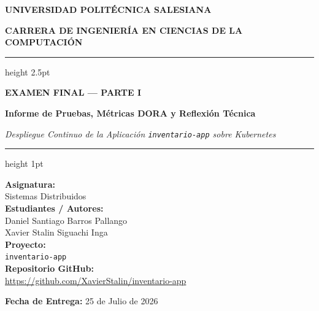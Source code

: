 \documentclass[11pt,a4paper]{article}
\begin{document}
\begin{titlepage}
    \centering
    
    \vspace*{0.5cm}
    
    {\Huge \bfseries UNIVERSIDAD POLITÉCNICA SALESIANA \par}
    \vspace{0.3cm}
    {\Large \bfseries CARRERA DE INGENIERÍA EN CIENCIAS DE LA COMPUTACIÓN \par}
    
    \vspace{1.2cm}
    
    {\color{navyblue}\hrule height 2.5pt}
    \vspace{0.6cm}
    
    {\huge \bfseries \color{navyblue} EXAMEN FINAL — PARTE I \par}
    \vspace{0.4cm}
    {\Large \bfseries Informe de Pruebas, Métricas DORA y Reflexión Técnica \par}
    \vspace{0.3cm}
    {\large \textit{Despliegue Continuo de la Aplicación \texttt{inventario-app} sobre Kubernetes} \par}
    
    \vspace{0.6cm}
    {\color{navyblue}\hrule height 1pt}
    
    \vspace{2cm}
    
    \begin{center}
        \large
        \textbf{Asignatura:} \\[0.1cm]
        Sistemas Distribuidos \\[0.5cm]
        
        \textbf{Estudiantes / Autores:} \\[0.1cm]
        Daniel Santiago Barros Pallango \\
        Xavier Stalin Siguachi Inga \\[0.5cm]
        
        \textbf{Proyecto:} \\[0.1cm]
        \texttt{inventario-app} \\[0.5cm]
        
        \textbf{Repositorio GitHub:} \\[0.1cm]
        {\small\url{https://github.com/XavierStalin/inventario-app}}
    \end{center}
    
    \vfill
    
    {\large \textbf{Fecha de Entrega:} 25 de Julio de 2026 \par}
    
\end{titlepage}
\end{document}
